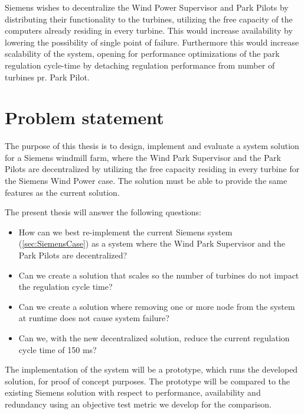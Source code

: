 Siemens wishes to decentralize the Wind Power Supervisor and Park Pilots by distributing their functionality to the turbines, utilizing the free capacity of the computers already residing in every turbine. This would increase availability by lowering the possibility of single point of failure. Furthermore this would increase scalability of the system, opening for performance optimizations of the park regulation cycle-time by detaching regulation performance from number of turbines pr. Park Pilot. 


\section{Problem statement}

The purpose of this thesis is to design, implement and evaluate a system solution for a Siemens windmill farm, where the Wind Park Supervisor and the Park Pilots are decentralized by utilizing the free capacity residing in every turbine for the Siemens Wind Power case. The solution must be able to provide the same features as the current solution. 

The present thesis will answer the following questions: 

\begin{itemize} 
	\item How can we best re-implement the current Siemens system (\cref{sec:SiemensCase}) as a system where the Wind Park Supervisor and the Park Pilots are decentralized?
	\item Can we create a solution that scales so the number of turbines do not impact the regulation cycle time?
	\item Can we create a solution where removing one or more node from the system at runtime does not cause system failure?
	\item Can we, with the new decentralized solution, reduce the current regulation cycle time of 150 ms?
\end{itemize}

The implementation of the system will be a prototype, which runs the developed solution, for proof of concept purposes. The prototype will be compared to the existing Siemens solution with respect to performance, availability and redundancy using an objective test metric we develop for the comparison.



